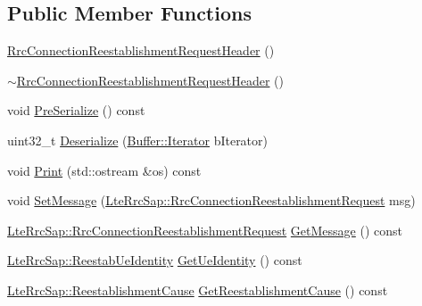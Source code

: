\subsection*{Public Member Functions}
\begin{DoxyCompactItemize}
\item 
\hyperlink{classns3_1_1RrcConnectionReestablishmentRequestHeader_abc4ffca8f9d030ce917020911e9b9897}{Rrc\+Connection\+Reestablishment\+Request\+Header} ()
\item 
\hyperlink{classns3_1_1RrcConnectionReestablishmentRequestHeader_a3991c8b83179c0a423de26dc6f190ce5}{$\sim$\+Rrc\+Connection\+Reestablishment\+Request\+Header} ()
\item 
void \hyperlink{classns3_1_1RrcConnectionReestablishmentRequestHeader_ab2eca8c0b5a1a7586b661febbba9a787}{Pre\+Serialize} () const 
\item 
uint32\+\_\+t \hyperlink{classns3_1_1RrcConnectionReestablishmentRequestHeader_a912a20fb879046a7c61a8f5124e6b809}{Deserialize} (\hyperlink{classns3_1_1Buffer_1_1Iterator}{Buffer\+::\+Iterator} b\+Iterator)
\item 
void \hyperlink{classns3_1_1RrcConnectionReestablishmentRequestHeader_a07f4c6e08e798635f84df3e16e1e70d8}{Print} (std\+::ostream \&os) const 
\item 
void \hyperlink{classns3_1_1RrcConnectionReestablishmentRequestHeader_a4ce7922a616a0692d195cb49360dea7b}{Set\+Message} (\hyperlink{structns3_1_1LteRrcSap_1_1RrcConnectionReestablishmentRequest}{Lte\+Rrc\+Sap\+::\+Rrc\+Connection\+Reestablishment\+Request} msg)
\item 
\hyperlink{structns3_1_1LteRrcSap_1_1RrcConnectionReestablishmentRequest}{Lte\+Rrc\+Sap\+::\+Rrc\+Connection\+Reestablishment\+Request} \hyperlink{classns3_1_1RrcConnectionReestablishmentRequestHeader_aa302cca0ba435f968234f9600990a138}{Get\+Message} () const 
\item 
\hyperlink{structns3_1_1LteRrcSap_1_1ReestabUeIdentity}{Lte\+Rrc\+Sap\+::\+Reestab\+Ue\+Identity} \hyperlink{classns3_1_1RrcConnectionReestablishmentRequestHeader_a67f63eb41f3cdc06485c23f40662f536}{Get\+Ue\+Identity} () const 
\item 
\hyperlink{classns3_1_1LteRrcSap_ae749c5fa44cab5b732095b42f4845659}{Lte\+Rrc\+Sap\+::\+Reestablishment\+Cause} \hyperlink{classns3_1_1RrcConnectionReestablishmentRequestHeader_a2dac71e3a64e2277e2c5466bf237739d}{Get\+Reestablishment\+Cause} () const 
\end{DoxyCompactItemize}
